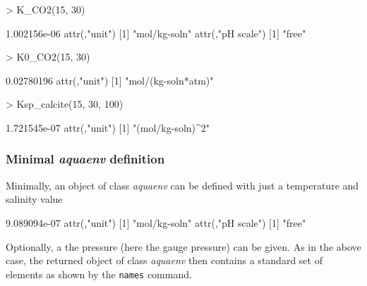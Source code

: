 \documentclass[article,nojss]{jss}
\begin{document}
\begin{Schunk}
\begin{Sinput}
> K_CO2(15, 30)
\end{Sinput}
\begin{Soutput}
[1] 1.002156e-06
attr(,"unit")
[1] "mol/kg-soln"
attr(,"pH scale")
[1] "free"
\end{Soutput}
\begin{Sinput}
> K0_CO2(15, 30)
\end{Sinput}
\begin{Soutput}
[1] 0.02780196
attr(,"unit")
[1] "mol/(kg-soln*atm)"
\end{Soutput}
\begin{Sinput}
> Ksp_calcite(15, 30, 100)
\end{Sinput}
\begin{Soutput}
[1] 1.721545e-07
attr(,"unit")
[1] "(mol/kg-soln)^2"
\end{Soutput}
\end{Schunk}


\subsubsection{Minimal \textit{aquaenv} definition}
Minimally, an object of class \textit{aquaenv} can be defined with just a temperature and salinity value

\begin{Schunk}
\begin{Soutput}
[1] 9.089094e-07
attr(,"unit")
[1] "mol/kg-soln"
attr(,"pH scale")
[1] "free"
\end{Soutput}
\end{Schunk}

Optionally, a the pressure (here the gauge pressure) can be given. As in the above case, the returned object of class \textit{aquaenv} then contains
a standard set of elements as shown by the \texttt{names} command.
\end{document}
